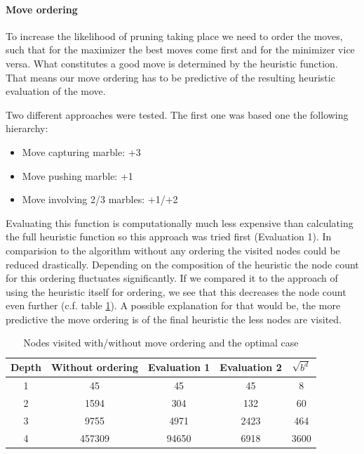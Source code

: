 \documentclass{llncs}
\begin{document}
\paragraph{Move ordering}
To increase the likelihood of pruning taking place we need to order the moves, such that for the maximizer the best moves come first and for the minimizer vice versa. What constitutes a good move is determined by the heuristic function. That means our move ordering has to be predictive of the resulting heuristic evaluation of the move.

Two different approaches were tested. The first one was based one the following hierarchy:

\begin{itemize}
  \item Move capturing marble: +3
  \item Move pushing marble: +1
  \item Move involving 2/3 marbles: +1/+2
\end{itemize}

Evaluating this function is computationally much less expensive than calculating the full heuristic function so this approach was tried first (Evaluation 1). In comparision to the algorithm without any ordering the visited nodes could be reduced drastically. Depending on the composition of the heuristic the node count for this ordering fluctuates significantly. If we compared it to the approach of using the heuristic itself for ordering, we see that this decreases the node count even further (c.f. table \ref{node_count}). A possible explanation for that would be, the more predictive the move ordering is of the final heuristic the less nodes are visited.

\begin{table}
  \begin{center}
    \begin{tabular}{ | c | c | c | c | c | }
      \hline
      Depth & Without ordering & Evaluation 1 & Evaluation 2 & $\sqrt{b^d}$ \\
      \hline
      1     & 45               & 45           & 45           & 8            \\
      \hline
      2     & 1594             & 304          & 132          & 60           \\
      \hline
      3     & 9755             & 4971         & 2423         & 464          \\
      \hline
      4     & 457309           & 94650        & 6918         & 3600         \\
      \hline
    \end{tabular}
  \end{center}
  \caption{Nodes visited with/without move ordering and the optimal case}
  \label{node_count}
\end{table}
\end{document}
